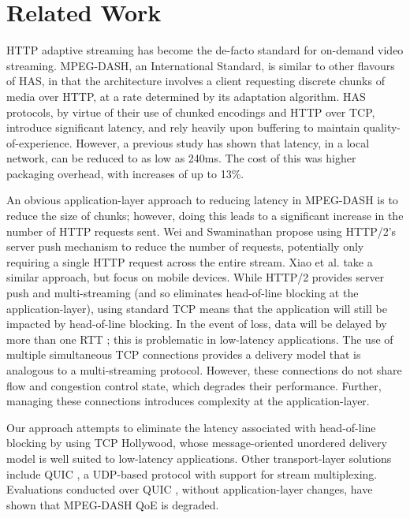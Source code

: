 \section{Related Work}
\label{sec:related}

HTTP adaptive streaming has become the de-facto standard for on-demand video streaming.
MPEG-DASH, an International Standard, is similar to other flavours of HAS, in that the
architecture involves a client requesting discrete chunks of media over HTTP, at a rate
determined by its adaptation algorithm. HAS protocols, by virtue of their use of chunked
encodings and HTTP over TCP, introduce significant latency, and rely heavily upon
buffering to maintain quality-of-experience. However, a previous study has shown that
latency, in a local network, can be reduced to as low as 240ms\cite{bouzakaria2014overhead}. The cost of this was
higher packaging overhead, with increases of up to 13\%.

An obvious application-layer approach to reducing latency in MPEG-DASH is to reduce the
size of chunks; however, doing this leads to a significant increase in the number of HTTP
requests sent. Wei and Swaminathan \cite{wei2014low} propose using HTTP/2's server push
mechanism to reduce the number of requests, potentially only requiring a single HTTP
request across the entire stream. Xiao et al. \cite{xiao2016dash2m} take a similar
approach, but focus on mobile devices. While HTTP/2 provides server push and
multi-streaming (and so eliminates head-of-line blocking at the application-layer), using
standard TCP means that the application will still be impacted by head-of-line blocking.
In the event of loss, data will be delayed by more than one RTT \cite{mcquistin2016tcp2};
this is problematic in low-latency applications. The use of multiple simultaneous
TCP connections provides a delivery model that is analogous to a multi-streaming protocol.
However, these connections do not share flow and congestion control state, which degrades
their performance. Further, managing these connections introduces complexity at the
application-layer.

Our approach attempts to eliminate the latency associated with head-of-line blocking by
using TCP Hollywood, whose message-oriented unordered delivery model is well suited to
low-latency applications. Other transport-layer solutions include QUIC
\cite{draft-ietf-quic-transport-latest}, a UDP-based protocol with support for stream
multiplexing. Evaluations conducted over QUIC \cite{bhat:2017:not-so-quic}, without application-layer changes,
have shown that MPEG-DASH QoE is degraded. 

